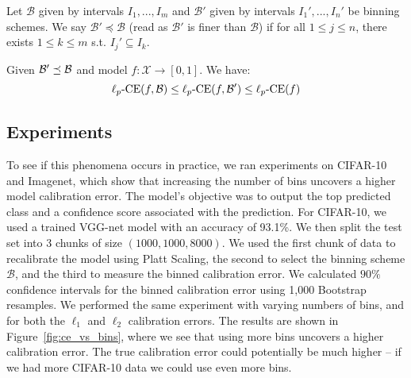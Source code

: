 \begin{definition}
Let $\mathcal{B}$ given by intervals $I_1, ..., I_m$ and $\mathcal{B}'$ given by intervals $I_1', ..., I_n'$ be binning schemes. We say $\mathcal{B}' \preceq \mathcal{B}$ (read as $\mathcal{B}'$ is finer than $\mathcal{B}$) if for all $1 \leq j \leq n$, there exists $1 \leq k \leq m$ s.t. $I_j' \subseteq I_k$. 
\end{definition}


\begin{proposition}
Given $\mathcal{B}{}' \preceq \mathcal{B}{}$ and model $f : \mathcal{X} \to [0, 1]$. We have:
\[  \ell_p\mbox{-CE}(f, \mathcal{B}{}) \leq \ell_p\mbox{-CE}(f, \mathcal{B}{}') \leq \ell_p\mbox{-CE}(f) \]
\end{proposition}

\subsection{Experiments}

To see if this phenomena occurs in practice, we ran experiments on CIFAR-10 and Imagenet, which show that increasing the number of bins uncovers a higher model calibration error.
The model's objective was to output the top predicted class and a confidence score associated with the prediction.
For CIFAR-10, we used a trained VGG-net model with an accuracy of 93.1\%.
We then split the test set into 3 chunks of size $(1000, 1000, 8000)$.
We used the first chunk of data to recalibrate the model using Platt Scaling, the second to select the binning scheme $\mathcal{B}$, and the third to measure the binned calibration error.
We calculated $90\%$ confidence intervals for the binned calibration error using 1,000 Bootstrap resamples.
We performed the same experiment with varying numbers of bins, and for both the $\ell_1$ and $\ell_2$ calibration errors.
The results are shown in Figure~\ref{fig:ce_vs_bins}, where we see that using more bins uncovers a higher calibration error. 
The true calibration error could potentially be much higher -- if we had more CIFAR-10 data we could use even more bins.

